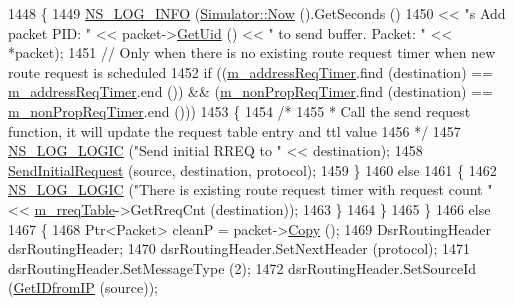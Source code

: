 \begin{DoxyCode}
1448             \{
1449               \hyperlink{group__logging_gafbd73ee2cf9f26b319f49086d8e860fb}{NS\_LOG\_INFO} (\hyperlink{classns3_1_1Simulator_ac3178fa975b419f7875e7105be122800}{Simulator::Now} ().GetSeconds ()
1450                            << \textcolor{stringliteral}{"s Add packet PID: "} << packet->\hyperlink{classns3_1_1Packet_a1f212c825b50e54d94f5b9ae99592e6a}{GetUid} () << \textcolor{stringliteral}{" to send buffer. Packet: 
      "} << *packet);
1451               \textcolor{comment}{// Only when there is no existing route request timer when new route request is scheduled}
1452               \textcolor{keywordflow}{if} ((\hyperlink{classns3_1_1dsr_1_1DsrRouting_a47174823b0622573b681afc40d6ea558}{m\_addressReqTimer}.find (destination) == 
      \hyperlink{classns3_1_1dsr_1_1DsrRouting_a47174823b0622573b681afc40d6ea558}{m\_addressReqTimer}.end ()) && (\hyperlink{classns3_1_1dsr_1_1DsrRouting_a0936df610f90f7e79c24a2a8cdea6c14}{m\_nonPropReqTimer}.find (destination) == 
      \hyperlink{classns3_1_1dsr_1_1DsrRouting_a0936df610f90f7e79c24a2a8cdea6c14}{m\_nonPropReqTimer}.end ()))
1453                 \{
1454                   \textcolor{comment}{/*}
1455 \textcolor{comment}{                   * Call the send request function, it will update the request table entry and ttl value}
1456 \textcolor{comment}{                   */}
1457                   \hyperlink{group__logging_ga88acd260151caf2db9c0fc84997f45ce}{NS\_LOG\_LOGIC} (\textcolor{stringliteral}{"Send initial RREQ to "} << destination);
1458                   \hyperlink{classns3_1_1dsr_1_1DsrRouting_a74777d1806e768fccc1c2fe169b42c98}{SendInitialRequest} (source, destination, protocol);
1459                 \}
1460               \textcolor{keywordflow}{else}
1461                 \{
1462                   \hyperlink{group__logging_ga88acd260151caf2db9c0fc84997f45ce}{NS\_LOG\_LOGIC} (\textcolor{stringliteral}{"There is existing route request timer with request count "} << 
      \hyperlink{classns3_1_1dsr_1_1DsrRouting_ae9ec27743735fa2d59cc5190961d1942}{m\_rreqTable}->GetRreqCnt (destination));
1463                 \}
1464             \}
1465         \}
1466       \textcolor{keywordflow}{else}
1467         \{
1468           Ptr<Packet> cleanP = packet->\hyperlink{classns3_1_1Packet_a5d5c70802a5f77fc5f0001e0cfc1898b}{Copy} ();
1469           DsrRoutingHeader dsrRoutingHeader;
1470           dsrRoutingHeader.SetNextHeader (protocol);
1471           dsrRoutingHeader.SetMessageType (2);
1472           dsrRoutingHeader.SetSourceId (\hyperlink{classns3_1_1dsr_1_1DsrRouting_a4593e50d5f36e9b9b013fe0422067c44}{GetIDfromIP} (source));

\end{DoxyCode}
